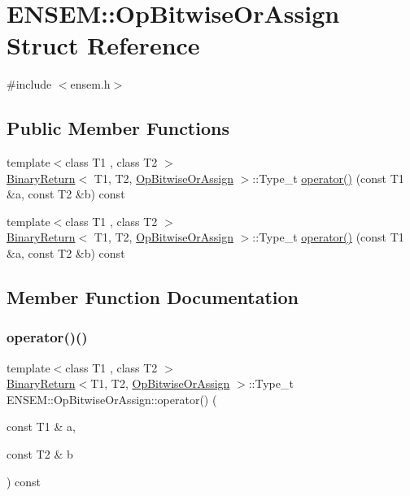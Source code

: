 \hypertarget{structENSEM_1_1OpBitwiseOrAssign}{}\section{E\+N\+S\+EM\+:\+:Op\+Bitwise\+Or\+Assign Struct Reference}
\label{structENSEM_1_1OpBitwiseOrAssign}


{\ttfamily \#include $<$ensem.\+h$>$}

\subsection*{Public Member Functions}
\begin{DoxyCompactItemize}
\item 
{\footnotesize template$<$class T1 , class T2 $>$ }\\\mbox{\hyperlink{structENSEM_1_1BinaryReturn}{Binary\+Return}}$<$ T1, T2, \mbox{\hyperlink{structENSEM_1_1OpBitwiseOrAssign}{Op\+Bitwise\+Or\+Assign}} $>$\+::Type\+\_\+t \mbox{\hyperlink{structENSEM_1_1OpBitwiseOrAssign_afddd4ba26f5d21bc671df619c5c4e33b}{operator()}} (const T1 \&a, const T2 \&b) const
\item 
{\footnotesize template$<$class T1 , class T2 $>$ }\\\mbox{\hyperlink{structENSEM_1_1BinaryReturn}{Binary\+Return}}$<$ T1, T2, \mbox{\hyperlink{structENSEM_1_1OpBitwiseOrAssign}{Op\+Bitwise\+Or\+Assign}} $>$\+::Type\+\_\+t \mbox{\hyperlink{structENSEM_1_1OpBitwiseOrAssign_afddd4ba26f5d21bc671df619c5c4e33b}{operator()}} (const T1 \&a, const T2 \&b) const
\end{DoxyCompactItemize}


\subsection{Member Function Documentation}
\mbox{\label{structENSEM_1_1OpBitwiseOrAssign_afddd4ba26f5d21bc671df619c5c4e33b}} 
\subsubsection{\texorpdfstring{operator()()}{operator()()}\hspace{0.1cm}{\footnotesize\ttfamily [1/2]}}
{\footnotesize\ttfamily template$<$class T1 , class T2 $>$ \\
\mbox{\hyperlink{structENSEM_1_1BinaryReturn}{Binary\+Return}}$<$T1, T2, \mbox{\hyperlink{structENSEM_1_1OpBitwiseOrAssign}{Op\+Bitwise\+Or\+Assign}} $>$\+::Type\+\_\+t E\+N\+S\+E\+M\+::\+Op\+Bitwise\+Or\+Assign\+::operator() (\begin{DoxyParamCaption}\item[{const T1 \&}]{a,  }\item[{const T2 \&}]{b }\end{DoxyParamCaption}) const\hspace{0.3cm}{\ttfamily [inline]}}

